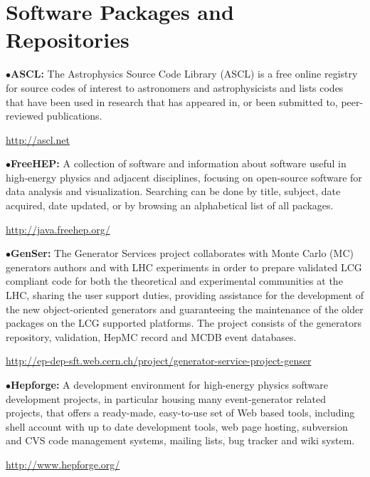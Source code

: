 \section{Software Packages and Repositories}  %

\medskip
{}
\medskip

\item{$\bullet$}{\bf ASCL:} 
The Astrophysics Source Code Library (ASCL) is a free online registry for source codes of interest to astronomers and astrophysicists and lists codes that have been used in research that has appeared in, or been submitted to, peer-reviewed publications. 
	\item{}\qquad\url{http://ascl.net}

\medskip

\item{$\bullet$}{\bf FreeHEP:}
A collection of software and information about software useful in high-energy physics and adjacent disciplines, focusing on open-source software for data analysis and visualization. Searching can be done by title, subject, date acquired, date updated, or by browsing an alphabetical list of all packages.
	\item{}\qquad\url{http://java.freehep.org/}

\medskip

\item{$\bullet$}{\bf GenSer:} The Generator Services project collaborates with Monte Carlo (MC) 
generators authors and with LHC experiments in order to prepare validated LCG compliant code for 
both the theoretical and experimental communities at the LHC, sharing the user support duties, 
providing assistance for the development of the new object-oriented generators and guaranteeing 
the maintenance of the older packages on the LCG supported platforms. The project consists of the 
generators repository, validation, HepMC record and MCDB event databases.
	\item{}\quad\url{http://ep-dep-sft.web.cern.ch/project/generator-service-project-genser}

\medskip

\item{$\bullet$}{\bf Hepforge:}
A development environment for high-energy physics software development projects, 
in particular housing many event-generator related projects, that offers a ready-made, 
easy-to-use set of Web based tools, including shell account with up to date development 
tools, web page hosting, subversion and CVS code management systems, mailing lists, bug tracker and wiki system.
	\item{}\qquad\url{http://www.hepforge.org/}

